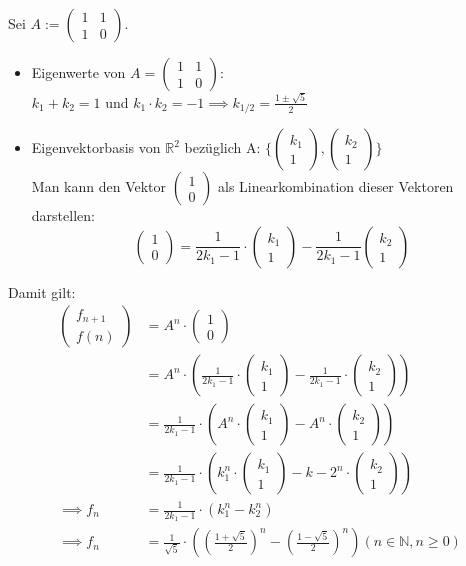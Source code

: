 \documentclass{article}
\newcommand{\N}{\mathbb{N}}
\newcommand{\R}{\mathbb{R}}
\newcommand{\vvec}[2]{\begin{pmatrix}#1\\#2\end{pmatrix}}
\begin{document}
\newpage
Sei $A := \begin{pmatrix}
    1 & 1\\
    1 & 0
\end{pmatrix}$.
\begin{itemize}
    \item Eigenwerte von $A = \begin{pmatrix}
        1 & 1\\
        1 & 0
    \end{pmatrix}:$\\
    $k_1 + k_2 = 1$ und $k_1 \cdot k_2 = -1 \implies k_{1/2} = \frac{1 \pm \sqrt{5}}{2}$
    \item Eigenvektorbasis von $\R^2$ bezüglich A: $\{\vvec{k_1}{1}, \vvec{k_2}{1}\}$\\
    Man kann den Vektor $\vvec{1}{0}$ als Linearkombination dieser Vektoren\\
    darstellen:
    \[
        \vvec{1}{0} = \frac{1}{2k_1-1} \cdot \vvec{k_1}{1} - \frac{1}{2k_1-1} \vvec{k_2}{1}
    \]
\end{itemize}
Damit gilt:
\begin{align*}
    \vvec{f_{n+1}}{f(n)} &= A^n \cdot \vvec{1}{0}\\
    &= A^n \cdot (\frac{1}{2k_1-1} \cdot \vvec{k_1}{1} - \frac{1}{2k_1-1} \cdot \vvec{k_2}{1})\\
    &= \frac{1}{2k_1-1} \cdot (A^n \cdot \vvec{k_1}{1} - A^n \cdot \vvec{k_2}{1})\\
    &= \frac{1}{2k_1-1} \cdot (k_1^n \cdot \vvec{k_1}{1} - k-2^n \cdot \vvec{k_2}{1})\\
    \implies f_n &= \frac{1}{2k_1-1} \cdot (k_1^n - k_2^n)\\
    \implies f_n &= \frac{1}{\sqrt{5}} \cdot ((\frac{1 + \sqrt{5}}{2})^n - (\frac{1 - \sqrt{5}}{2})^n) (n \in \N, n \ge 0)
\end{align*}
\end{document}
